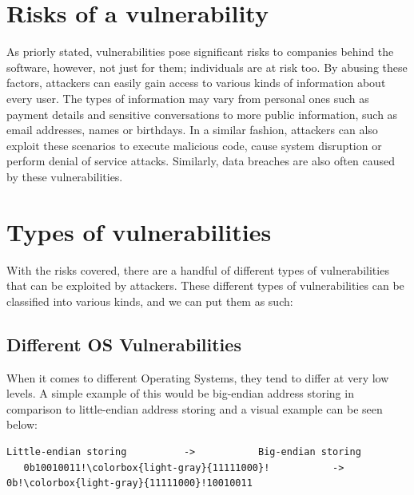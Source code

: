 
\section{Risks of a vulnerability}

As priorly stated, vulnerabilities pose significant risks to companies behind the software, however, not just for them; individuals are at risk too. By abusing these factors, attackers can easily gain access to various kinds of information about every user. The types of information may vary from personal ones such as payment details and sensitive conversations to more public information, such as email addresses, names or birthdays. In a similar fashion, attackers can also exploit these scenarios to execute malicious code, cause system disruption or perform denial of service attacks. Similarly, data breaches are also often caused by these vulnerabilities.

\newpage
\section{Types of vulnerabilities}

With the risks covered, there are a handful of different types of vulnerabilities that can be exploited by attackers. These different types of vulnerabilities can be classified into various kinds, and we can put them as such:
\vspace{-2px}
\subsection{Different OS Vulnerabilities}
When it comes to different Operating Systems, they tend to differ at very low levels. A simple example of this would be big-endian address storing in comparison to little-endian address storing \cite{bradley2007defining} and a visual example can be seen below:
\begin{lstlisting}[caption = {Little-endian vs Big-endian}, columns=fixed, basewidth=0.5em, basicstyle={\ttfamily}, frame=lines, escapechar=!]
  Little-endian storing          ->           Big-endian storing
   0b10010011!\colorbox{light-gray}{11111000}!           ->           0b!\colorbox{light-gray}{11111000}!10010011
\end{lstlisting}









